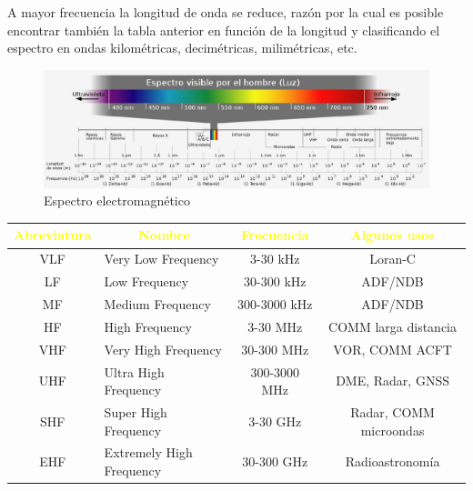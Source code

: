 A mayor frecuencia la longitud de onda se reduce, raz\'on por la cual es posible encontrar tambi\'en la tabla anterior en funci\'on de la longitud y clasificando el espectro en ondas kilom\'etricas, decim\'etricas, milim\'etricas, etc.  	  	 



\begin{landscape}


\begin{figure}[!h]
  \centering
 \includegraphics[width=\textheight]{06.radionavegacion/Imagenes/06.01.adf/electromagneticspectrumes.eps}   
  \caption{Espectro electromagn\'etico}
  \label{fig:espectro-electromagnetico}
\end{figure}

  \begin{minipage}[c]{0.50\textheight}
    \centering 
    \label{tab:espectro-radioelectrico}

    \begin{adjustbox}{width = 0.9\linewidth}
      \begin{tabular}{|c|l|c|c|}
        \hline \rowcolor{blue!50!black}
        \textcolor{yellow}{\bf Abreviatura} & \multicolumn{1}{c}{\textcolor{yellow}{\bf  Nombre}}
        & \textcolor{yellow}{\bf Frecuencia} & \textcolor{yellow}{\bf Algunos usos}\\ \hline \hline
        VLF 	& Very Low Frequency& 	3-30 kHz &	Loran-C \\ \hline
        LF 	&Low Frequency 	&30-300 kHz &	ADF/NDB \\ \hline
        MF 	&Medium Frequency 	&300-3000 kHz 	&ADF/NDB \\ \hline
        HF 	&High Frequency 	&3-30 MHz 	&COMM larga distancia \\ \hline
        VHF 	&Very High Frequency 	&30-300 MHz 	&VOR, COMM ACFT \\ \hline
        UHF 	&Ultra High Frequency 	&300-3000 MHz 	&DME, Radar, GNSS \\ \hline
        SHF 	&Super High Frequency 	&3-30 GHz 	&Radar, COMM microondas \\ \hline
        EHF 	&Extremely High Frequency &30-300 GHz 	&Radioastronom\'ia \\ \hline
      \end{tabular}  
    \end{adjustbox}


\end{minipage}
\end{landscape}
